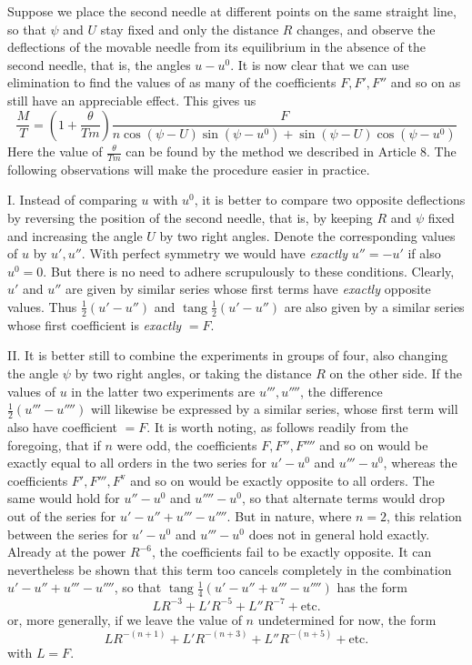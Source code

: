 Suppose we place the second needle at different points on the same straight line, so that $\psi$ and $U$ stay fixed and only the distance $R$ changes, and observe the deflections of the movable needle from its equilibrium in the absence of the second needle, that is, the angles $u-u^0$. It is now clear that we can use elimination to find the values of as many of the coefficients $F,F',F''$ and so on as still have an appreciable effect. This gives us
\[
\frac MT=\left(1+\frac{\theta}{Tm}\right)\frac{F}{n\cos(\psi-U)\sin(\psi-u^0)+\sin(\psi-U)\cos(\psi-u^0)}
\]
Here the value of $\frac{\theta}{Tm}$ can be found by the method we described in Article $8$. The following observations will make the procedure easier in practice.

I. Instead of comparing $u$ with $u^0$, it is better to compare two opposite deflections by reversing the position of the second needle, that is, by keeping $R$ and $\psi$ fixed and increasing the angle $U$ by two right angles. Denote the corresponding values of $u$ by $u',u''$. With perfect symmetry we would have \textit{exactly} $u''=-u'$ if also $u^0=0$. But there is no need to adhere scrupulously to these conditions. Clearly, $u'$ and $u''$ are given by similar series whose first terms have \textit{exactly} opposite values. Thus $\tfrac12(u'-u'')$ and $\operatorname{tang}\tfrac12(u'-u'')$ are also given by a similar series whose first coefficient is \textit{exactly} $=F$.

II. It is better still to combine the experiments in groups of four, also changing the angle $\psi$ by two right angles, or taking the distance $R$ on the other side. If the values of $u$ in the latter two experiments are $u''',u''''$, the difference $\tfrac12(u'''-u'''')$ will likewise be expressed by a similar series, whose first term will also have coefficient $=F$. It is worth noting, as follows readily from the foregoing, that if $n$ were odd, the coefficients $F,F'',F''''$ and so on would be exactly equal to all orders in the two series for $u'-u^0$ and $u'''-u^0$, whereas the coefficients $F',F''',F^{\mathrm{v}}$ and so on would be exactly opposite to all orders. The same would hold for $u''-u^0$ and $u''''-u^0$, so that alternate terms would drop out of the series for $u'-u''+u'''-u''''$. But in nature, where $n=2$, this relation between the series for $u'-u^0$ and $u'''-u^0$ does not in general hold exactly. Already at the power $R^{-6}$, the coefficients fail to be exactly opposite. It can nevertheless be shown that this term too cancels completely in the combination $u'-u''+u'''-u''''$, so that $\operatorname{tang}\tfrac14(u'-u''+u'''-u'''')$ has the form
\[
LR^{-3}+L'R^{-5}+L''R^{-7}+\text{etc.}
\]
or, more generally, if we leave the value of $n$ undetermined for now, the form
\[
LR^{-(n+1)}+L'R^{-(n+3)}+L''R^{-(n+5)}+\text{etc.}
\]
with $L=F$.

